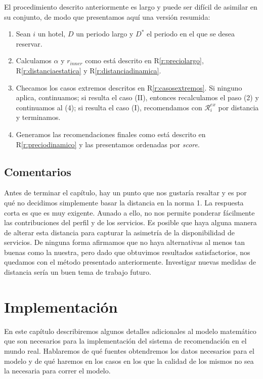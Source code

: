 \documentclass[12pt]{report}
\newcommand{\RR}{\mathcal{R}}
\begin{document}
El procedimiento descrito anteriormente es largo y puede ser difícil de asimilar en su conjunto, de modo que presentamos aquí una versión resumida:
\begin{enumerate}
	\item Sean $i$ un hotel, $D$ un periodo largo y $D^*$ el periodo en el que se desea reservar.
	\item Calculamos $\alpha$ y $r_{inner}$ como está descrito en R\ref{r:preciolargo}, R\ref{r:distanciaestatica} y R\ref{r:distanciadinamica}.
	\item Checamos los casos extremos descritos en R\ref{r:casosextremos}. Si ninguno aplica, continuamos; si resulta el caso (II), entonces recalculamos el paso (2) y continuamos al (4); si resulta el caso (I), recomendamos con $\RR_i^{ex}$ por distancia y terminamos.
	\item Generamos las recomendaciones finales como está descrito en R\ref{r:preciodinamico} y las presentamos ordenadas por \emph{score}.
\end{enumerate}

\section{Comentarios}

Antes de terminar el capítulo, hay un punto que nos gustaría resaltar y es por qué no decidimos simplemente basar la distancia en la norma 1. La respuesta corta es que es muy exigente. Aunado a ello, no nos permite ponderar fácilmente las contribuciones del perfil y de los servicios. Es posible que haya alguna manera de alterar esta distancia para capturar la asimetría de la disponibilidad de servicios. De ninguna forma afirmamos que no haya alternativas al menos tan buenas como la nuestra, pero dado que obtuvimos resultados satisfactorios, nos quedamos con el método presentado anteriormente. Investigar nuevas medidas de distancia sería un buen tema de trabajo futuro.




\chapter{Implementación} \label{cap:3}

En este capítulo describiremos algunos detalles adicionales al modelo matemático que son necesarios para la implementación del sistema de recomendación en el mundo real. Hablaremos de qué fuentes obtendremos los datos necesarios para el modelo y de qué haremos en los casos en los que la calidad de los mismos no sea la necesaria para correr el modelo.
\end{document}
